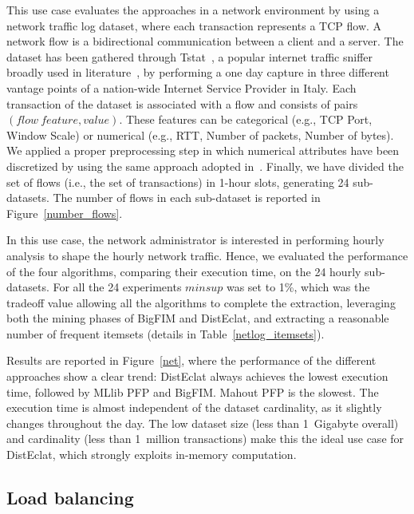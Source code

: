 This use case evaluates the approaches in a network environment by
using a network traffic log dataset, where each transaction represents a TCP flow.
A network flow is a bidirectional communication between a client and a server.
The dataset has been gathered through Tstat~\cite{Tstat,Tstat2}, a popular
internet traffic sniffer broadly used in
literature~\cite{giordano2015youlighter,ApilettiBCCG13},
by performing a one day capture in three different vantage points
of a nation-wide Internet Service Provider in Italy.
Each transaction of the dataset is associated with
a flow and consists of pairs $(flow~feature, value)$. These features can be
categorical (e.g., TCP Port, Window Scale) or numerical (e.g., RTT,
Number of packets, Number of bytes). We applied a proper preprocessing step in
which numerical attributes have been discretized by using the same
approach adopted in~\cite{ApilettiBCCG13}.
Finally, we have divided the set of flows (i.e., the set of transactions)
in 1-hour slots, generating 24 sub-datasets.
The number of flows in each sub-dataset
is reported in Figure~\ref{number_flows}.

In this use case, the network administrator is interested in performing hourly
analysis to shape the hourly network traffic.
Hence, we evaluated the performance of the four algorithms,
comparing their execution time, on the 24 hourly sub-datasets.
For all the 24 experiments $minsup$ was set to 1\%, which was
the tradeoff value allowing all the algorithms to complete the extraction,
leveraging both the mining phases of BigFIM and DistEclat,
and extracting a reasonable number of frequent itemsets
(details in Table~\ref{netlog_itemsets}).

Results are reported in Figure~\ref{net}, where the performance of the
different approaches show a clear trend: DistEclat always achieves the
lowest execution time, followed by MLlib PFP and BigFIM.
Mahout PFP is the slowest.
The execution time is almost independent of the dataset cardinality,
as it slightly changes throughout the day.
The low dataset size (less than 1~Gigabyte overall)
and cardinality (less than 1~million transactions) make this the ideal
use case for DistEclat, which strongly exploits in-memory computation.



\subsection{Load balancing}
\label{load_exp}


